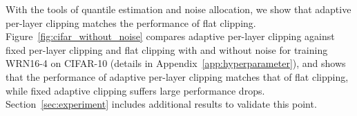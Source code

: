 














    
    











With the tools of quantile estimation and noise allocation, we show that adaptive per-layer clipping matches the performance of flat clipping. 
Figure~\ref{fig:cifar_without_noise} compares adaptive per-layer clipping against fixed per-layer clipping and flat clipping with and without noise for training WRN16-4 on CIFAR-10 (details in Appendix~\ref{app:hyperparameter}), and
shows that the performance of adaptive per-layer clipping matches that of flat clipping, while fixed adaptive clipping suffers large performance drops.
Section~\ref{sec:experiment} includes additional results to validate this point.



